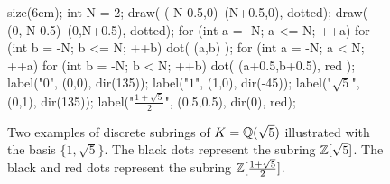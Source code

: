 \begin{figure}[ht]
	\centering
	\begin{center}
		\begin{asy}
		size(6cm);
		int N = 2;
		draw( (-N-0.5,0)--(N+0.5,0), dotted);
		draw( (0,-N-0.5)--(0,N+0.5), dotted);
		for (int a = -N; a <= N; ++a) {
			for (int b = -N; b <= N; ++b) {
				dot( (a,b) );
			}
		}
		for (int a = -N; a < N; ++a) {
			for (int b = -N; b < N; ++b) {
				dot( (a+0.5,b+0.5), red );
			}
		}
		label("$0$", (0,0), dir(135));
		label("$1$", (1,0), dir(-45));
		label("$\sqrt 5$", (0,1), dir(135));
		label("$\frac{1+\sqrt5}{2}$", (0.5,0.5), dir(0), red);
		\end{asy}
	\end{center}
	\caption{Two examples of discrete subrings of $K = \mathbb Q(\sqrt5)$
		illustrated with the basis $\{1,\sqrt5\}$.
		The black dots represent the subring $\mathbb Z[\sqrt5]$.
		The black and red dots represent the subring $\mathbb Z[\frac{1+\sqrt5}{2}]$.}
	\label{fig:discrete_QQ_sqrt5}
\end{figure}
